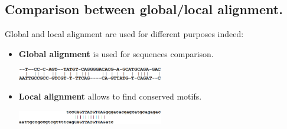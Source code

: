 \subsection{Comparison between global/local alignment.} Global and local alignment are used for different purposes indeed:
\begin{itemize}
	\item \textbf{Global alignment} is used for sequences comparison.
	\begin{center}
		\includegraphics[width=0.5\textwidth]{img/global}
	\end{center}
	\item \textbf{Local alignment} allows to find conserved motifs.
	\begin{center}
	\includegraphics[width=0.5\textwidth]{img/local}
	\end{center}
\end{itemize}


